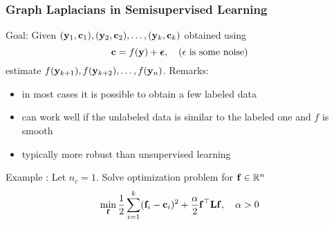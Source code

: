 \documentclass[12pt,handout]{beamer}
\begin{document}
\begin{frame}
\frametitle{Graph Laplacians in Semisupervised Learning}

Goal: Given $({\bf y}_1, {\bf c}_1), ({\bf y}_2, {\bf c}_2), \ldots, ({\bf y}_k,{\bf c}_k)$ obtained using
\begin{equation*}
	{\bf c} = f({\bf y}) + \boldsymbol{\epsilon}, \quad \text{($\epsilon$ is  some noise)}
\end{equation*}
estimate $f({\bf y}_{k+1}), f({\bf y}_{k+2}), \ldots, f({\bf y}_n)$. Remarks:

\begin{itemize}
\item
in most cases it is possible to obtain a few labeled data
\item 
can work well if the unlabeled data is similar to the labeled one and $f$ is smooth
\item
typically more robust than unsupervised learning
\end{itemize}

\bigskip

Example : Let $n_c=1$. Solve optimization problem for ${\bf f} \in \mathbb{R}^n$
\begin{equation*}
	\min_{{\bf f}} {\frac 12} \sum_{i=1}^k ({\bf f}_i - {\bf c}_i)^2 + \frac{\alpha}{2} {\bf f}^\top {\bf L} {\bf f}, \quad \alpha > 0
\end{equation*}


\end{frame}

%
%
%
%
%
%
%
\end{document}
